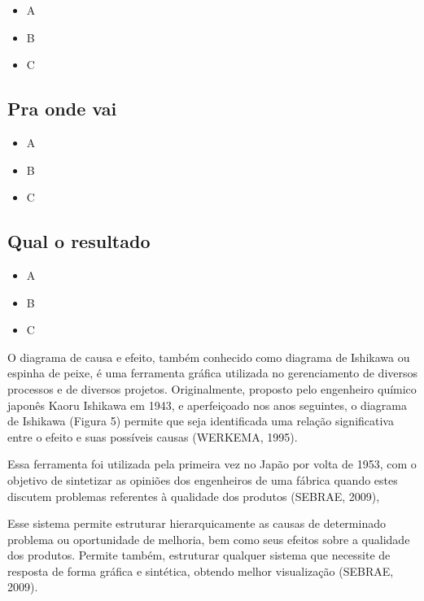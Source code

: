 \documentclass[
]{article}
\providecommand{\tightlist}{%
  \setlength{\itemsep}{0pt}\setlength{\parskip}{0pt}}
\begin{document}
\begin{itemize}
\tightlist
\item
  A
\item
  B
\item
  C
\end{itemize}

\hypertarget{pra-onde-vai-3}{%
\subsection*{Pra onde vai}\label{pra-onde-vai-3}}

\begin{itemize}
\tightlist
\item
  A
\item
  B
\item
  C
\end{itemize}

\hypertarget{qual-o-resultado-3}{%
\subsection*{Qual o resultado}\label{qual-o-resultado-3}}

\begin{itemize}
\tightlist
\item
  A
\item
  B
\item
  C
\end{itemize}

O diagrama de causa e efeito, também conhecido como diagrama de Ishikawa ou espinha de peixe, é uma ferramenta gráfica utilizada no gerenciamento de diversos processos e de diversos projetos. Originalmente, proposto pelo engenheiro químico japonês Kaoru Ishikawa em 1943, e aperfeiçoado nos anos seguintes, o diagrama de Ishikawa (Figura 5) permite que seja identificada uma relação significativa entre o efeito e suas possíveis causas (WERKEMA, 1995).

Essa ferramenta foi utilizada pela primeira vez no Japão por volta de 1953, com o objetivo de sintetizar as opiniões dos engenheiros de uma fábrica quando estes discutem problemas referentes à qualidade dos produtos (SEBRAE, 2009),

Esse sistema permite estruturar hierarquicamente as causas de determinado problema ou oportunidade de melhoria, bem como seus efeitos sobre a qualidade dos produtos. Permite também, estruturar qualquer sistema que necessite de resposta de forma gráfica e sintética, obtendo melhor visualização (SEBRAE, 2009).
\end{document}
